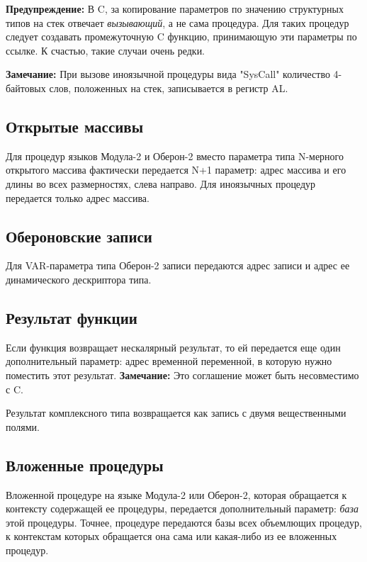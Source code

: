 {\bf Предупреждение:} В C, за копирование параметров по значению
структурных типов на стек отвечает {\em вызывающий}, а не сама процедура.
Для таких процедур следует создавать промежуточную C функцию,
принимающую эти параметры по ссылке. К счастью, такие случаи 
очень редки.

{\bf Замечание:} При вызове иноязычной процедуры вида "SysCall"
количество 4-байтовых слов, положенных на стек,
записывается в регистр AL. 

\subsection{Открытые массивы}

Для процедур языков Модула-2 и Оберон-2
вместо параметра типа N-мерного открытого массива фактически 
передается N+1 параметр: адрес массива и его длины во всех размерностях,
слева направо. Для иноязычных процедур передается только адрес массива.

\subsection{Обероновские записи}

Для VAR-параметра типа Оберон-2 записи передаются адрес записи и
адрес ее динамического дескриптора типа.

\subsection{Результат функции}

Если функция возвращает нескалярный результат, то ей передается
еще один дополнительный параметр: адрес временной переменной,
в которую нужно поместить этот результат.
{\bf Замечание:} Это соглашение может быть несовместимо с C.

Результат комплексного типа возвращается как запись с двумя
вещественными полями.

\subsection{Вложенные процедуры}

Вложенной процедуре на языке Модула-2 или Оберон-2, которая обращается
к контексту содержащей ее процедуры, передается дополнительный параметр:
{\em база} этой процедуры. Точнее, процедуре передаются базы
всех объемлющих процедур, к контекстам которых обращается она сама или
какая-либо  из ее вложенных процедур.

